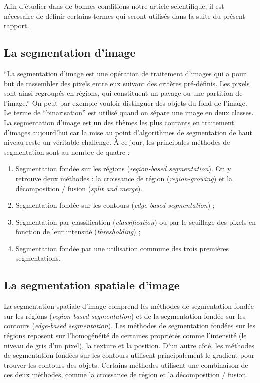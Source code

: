 Afin d'étudier dans de bonnes conditions notre article scientifique, il est nécessaire de définir certains termes qui seront utilisés dans la suite du présent rapport.

\subsection{La segmentation d'image}
	\enquote{La segmentation d'image est une opération de traitement d'images qui a pour but de rassembler des pixels entre eux suivant des critères pré-définis. Les pixels sont ainsi regroupés en régions, qui constituent un pavage ou une partition de l'image.}\cite{wikiSegmentationImage} On peut par exemple vouloir distinguer des objets du fond de l'image. Le terme de \enquote{binarisation} est utilisé quand on sépare une image en deux classes.\\

	La segmentation d'image est un des thèmes les plus courants en traitement d'images aujourd'hui car la mise au point d'algorithmes de segmentation de haut niveau reste un véritable challenge. À ce jour, les principales méthodes de segmentation sont au nombre de quatre :
	\vspace{10px}
	\begin{enumerate}
		\item Segmentation fondée sur les régions (\textit{region-based segmentation}). On y retrouve deux méthodes : la croissance de région (\textit{region-growing}) et la décomposition / fusion (\textit{split and merge}).
		\item Segmentation fondée sur les contours (\textit{edge-based segmentation}) ;
		\item Segmentation par classification (\textit{classification}) ou par le seuillage des pixels en fonction de leur intensité (\textit{thresholding}) ;
		\item Segmentation fondée par une utilisation commune des trois premières segmentations.
	\end{enumerate}

\subsection{La segmentation spatiale d'image}
	La segmentation spatiale d'image comprend les méthodes de segmentation fondée sur les régions (\textit{region-based segmentation}) et de la segmentation fondée sur les contours (\textit{edge-based segmentation}). Les méthodes de segmentation fondées sur les régions reposent sur l'homogénéité de certaines propriétés comme l'intensité (le niveau de gris d'un pixel), la texture et la position. D'un autre côté, les méthodes de segmentation fondées sur les contours utilisent principalement le gradient pour trouver les contours des objets. Certains méthodes utilisent une combinaison de ces deux méthodes, comme la croissance de région et la décomposition / fusion.

